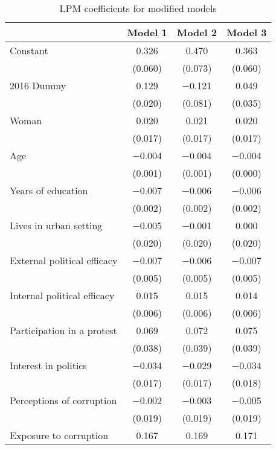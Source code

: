 \documentclass[12pt,a4]{article}
\begin{document}
\begin{table}[htbp]
\begin{center}
\caption{LPM coefficients for modified models}
\label{tab:complexmodlpm}

\begin{tabular}[t]{lccc}
\toprule
  & Model 1 & Model 2 & Model 3\\
\midrule
Constant & \num{0.326} & \num{0.470} & \num{0.363}\\
 & (\num{0.060}) & (\num{0.073}) & (\num{0.060})\\
2016 Dummy & \num{0.129} & \num{-0.121} & \num{0.049}\\
 & (\num{0.020}) & (\num{0.081}) & (\num{0.035})\\
Woman & \num{0.020} & \num{0.021} & \num{0.020}\\
 & (\num{0.017}) & (\num{0.017}) & (\num{0.017})\\
Age & \num{-0.004} & \num{-0.004} & \num{-0.004}\\
 & (\num{0.001}) & (\num{0.001}) & (\num{0.000})\\
Years of education & \num{-0.007} & \num{-0.006} & \num{-0.006}\\
 & (\num{0.002}) & (\num{0.002}) & (\num{0.002})\\
Lives in urban setting & \num{-0.005} & \num{-0.001} & \num{0.000}\\
 & (\num{0.020}) & (\num{0.020}) & (\num{0.020})\\
External political efficacy & \num{-0.007} & \num{-0.006} & \num{-0.007}\\
 & (\num{0.005}) & (\num{0.005}) & (\num{0.005})\\
Internal political efficacy & \num{0.015} & \num{0.015} & \num{0.014}\\
 & (\num{0.006}) & (\num{0.006}) & (\num{0.006})\\
Participation in a protest & \num{0.069} & \num{0.072} & \num{0.075}\\
 & (\num{0.038}) & (\num{0.039}) & (\num{0.039})\\
Interest in politics & \num{-0.034} & \num{-0.029} & \num{-0.034}\\
 & (\num{0.017}) & (\num{0.017}) & (\num{0.018})\\
Perceptions of corruption & \num{-0.002} & \num{-0.003} & \num{-0.005}\\
 & (\num{0.019}) & (\num{0.019}) & (\num{0.019})\\
Exposure to corruption & \num{0.167} & \num{0.169} & \num{0.171}\\

\end{tabular}
\end{center}
\end{table}
\end{document}
